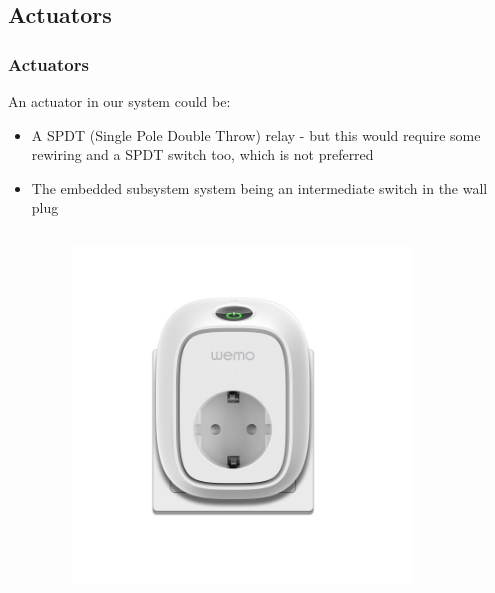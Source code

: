\subsection{Actuators}
\begin{frame}
	\frametitle{Actuators}
	An actuator in our system could be:
	\begin{itemize}
		\item A SPDT (Single Pole Double Throw) relay - but this would require some rewiring and a SPDT switch too, which is not preferred
		\item The embedded subsystem system being an intermediate switch in the wall plug
      \begin{columns}
      \begin{column}{0.48\textwidth}
		\begin{figure}[htbp]
		    \centering
        \includegraphics[width=\textwidth]{Images/wemo.jpeg}
		\end{figure}
      \end{column}
      \begin{column}{0.48\textwidth}
		\begin{figure}[htbp]
		    \centering

\end{figure}
\end{column}
\end{columns}
\end{itemize}
\end{frame}
